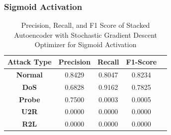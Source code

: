 \documentclass[12pt, a4paper]{report}
\begin{document}
\subsubsection{Sigmoid Activation}

\begin{table}[ht]
\centering
\captionsetup{justification=centering,margin=2cm}
\begin{tabular}{|c|c|c|c|c|}
\hline
\multicolumn{1}{|c|}{\textbf{Attack Type}} & \multicolumn{1}{c|}{\textbf{Precision}} & \multicolumn{1}{c|}{\textbf{Recall}} & \multicolumn{1}{c|}{\textbf{F1-Score}} \\ \hline
\textbf{Normal}        & 0.8429                                   & 0.8047                                & 0.8234                                                                  \\ \hline
\textbf{DoS}           & 0.6828                                  & 0.9162                                &  0.7825                                                                    \\ \hline
\textbf{Probe}         & 0.7500                                  & 0.0003                                & 0.0005                                                                  \\ \hline
\textbf{U2R}           & 0.0000                                    & 0.0000                                & 0.0000                                                                   \\ \hline
\textbf{R2L}           & 0.0000                                      & 0.0000                                   & 0.0000                                                            \\ \hline         \end{tabular}
\caption{Precision, Recall, and F1 Score of Stacked Autoencoder with Stochastic Gradient Descent Optimizer for Sigmoid Activation}
\label{prf1_sgd_sigmoid_auto}
\end{table}
\end{document}
